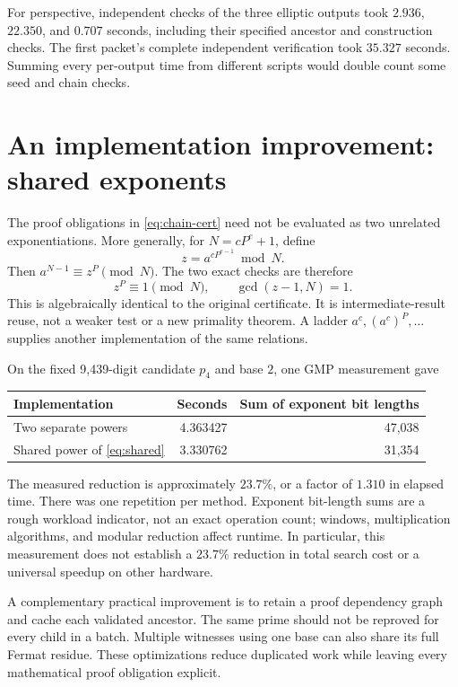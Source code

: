 \documentclass[11pt,a4paper]{article}
\theoremstyle{definition}\newtheorem{definition}[theorem]{Definition}
\theoremstyle{remark}\newtheorem{remark}[theorem]{Remark}
\begin{document}
For perspective, independent checks of the three elliptic outputs took
$2.936$, $22.350$, and $0.707$ seconds, including their specified ancestor
and construction checks. The first packet's complete independent verification
took $35.327$ seconds. Summing every per-output time from different scripts
would double count some seed and chain checks.

\section{An implementation improvement: shared exponents}
\label{sec:optimization}

The proof obligations in \eqref{eq:chain-cert} need not be evaluated as two
unrelated exponentiations. More generally, for $N=cP^e+1$, define
\[
 z=a^{cP^{e-1}}\bmod N.
\]
Then $a^{N-1}\equiv z^P\pmod N$. The two exact checks are therefore
\begin{equation}\label{eq:shared}
 z^P\equiv1\pmod N,\qquad \gcd(z-1,N)=1.
\end{equation}
This is algebraically identical to the original certificate. It is
intermediate-result reuse, not a weaker test or a new primality theorem.
A ladder $a^c,(a^c)^P,\ldots$ supplies another implementation of the same
relations.

On the fixed 9,439-digit candidate $p_4$ and base $2$, one GMP measurement
gave
\begin{center}
\begin{tabular}{@{}lrr@{}}
\toprule
Implementation & Seconds & Sum of exponent bit lengths\\
\midrule
Two separate powers & 4.363427 & 47,038\\
Shared power of \eqref{eq:shared} & 3.330762 & 31,354\\
\bottomrule
\end{tabular}
\end{center}
The measured reduction is approximately $23.7\%$, or a factor of $1.310$ in
elapsed time. There was one repetition per method. Exponent bit-length sums
are a rough workload indicator, not an exact operation count; windows,
multiplication algorithms, and modular reduction affect runtime. In
particular, this measurement does not establish a $23.7\%$ reduction in
total search cost or a universal speedup on other hardware.

A complementary practical improvement is to retain a proof dependency graph
and cache each validated ancestor. The same prime should not be reproved for
every child in a batch. Multiple witnesses using one base can also share its
full Fermat residue. These optimizations reduce duplicated work while leaving
every mathematical proof obligation explicit.
\end{document}
